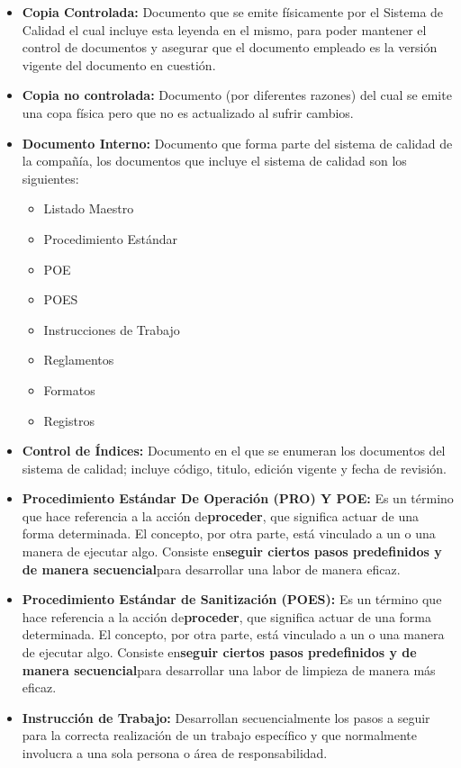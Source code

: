 \begin{itemize}
	\item \textbf{Copia Controlada:} Documento que se emite físicamente por el Sistema de Calidad el cual incluye esta leyenda en el mismo, para poder mantener el control de documentos y asegurar que el documento empleado es la versión vigente del documento en cuestión.
	\item \textbf{Copia no controlada:} Documento (por diferentes razones) del cual se emite una copa física pero que no es actualizado al sufrir cambios.
	\item \textbf{Documento Interno:} Documento que forma parte del sistema de calidad de la compañía, los documentos que incluye el sistema de calidad son los siguientes:
	\begin{itemize}
		\item Listado Maestro
		\item Procedimiento Estándar
		\item POE
		\item POES
		\item Instrucciones de Trabajo
		\item Reglamentos
		\item Formatos
		\item Registros
	\end{itemize}
	\item \textbf{Control de Índices:} Documento en el que se enumeran los documentos del sistema de calidad; incluye código, titulo, edición vigente y fecha de revisión.
	\item \textbf{Procedimiento Estándar De Operación (PRO) Y POE:} Es un término que hace referencia a la acción de\textbf{proceder}, que significa actuar de una forma determinada. El concepto, por otra parte, está vinculado a un o una manera de ejecutar algo. Consiste en\textbf{seguir ciertos pasos predefinidos y de manera secuencial}para desarrollar una labor de manera eficaz.
	\item \textbf{Procedimiento Estándar de Sanitización (POES):} Es un término que hace referencia a la acción de\textbf{proceder}, que significa actuar de una forma determinada. El concepto, por otra parte, está vinculado a un o una manera de ejecutar algo. Consiste en\textbf{seguir ciertos pasos predefinidos y de manera secuencial}para desarrollar una labor de limpieza de manera más eficaz.
	\item \textbf{Instrucción de Trabajo:} Desarrollan secuencialmente los pasos a seguir para la correcta realización de un trabajo específico y que normalmente involucra a una sola persona o área de responsabilidad.

\end{itemize}
